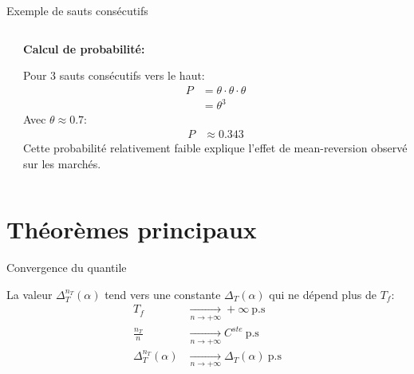 \documentclass[aspectratio=169]{beamer}  %
\begin{document}
\begin{frame}{Exemple de sauts consécutifs}
\begin{columns}
\begin{column}{0.6\textwidth}
        \end{column}
        \begin{column}{0.4\textwidth}
            \textbf{Calcul de probabilité:}
            \vspace{0.3cm}
            
            Pour 3 sauts consécutifs vers le haut:
            \begin{align*}
                P &= \theta \cdot \theta \cdot \theta \\
                &= \theta^3
            \end{align*}
            \vspace{0.2cm}
            Avec $\theta \approx 0.7$:
            \begin{align*}
                P &\approx 0.343
            \end{align*}
            \vspace{0.2cm}
            Cette probabilité relativement faible explique l'effet de mean-reversion observé sur les marchés.
        \end{column}
    \end{columns}
\end{frame}

\section{Théorèmes principaux}

\begin{frame}{Convergence du quantile}
    \begin{theorem}
        La valeur $\Delta_T^{n_T}(\alpha)$ tend vers une constante $\Delta_T(\alpha)$ qui ne dépend plus de $T_f$:
        \begin{align*}
            T_f &\underset{n\to +\infty}{\to}+\infty \ \text{p.s} \\
            \frac{n_T}{n} &\underset{n\to +\infty}{\to}C^{ste} \ \text{p.s} \\
            \Delta_T^{n_T}(\alpha) &\underset{n\to +\infty}{\to}\Delta_T(\alpha) \ \text{p.s}
        \end{align*}
    \end{theorem}
\end{frame}
\end{document}
